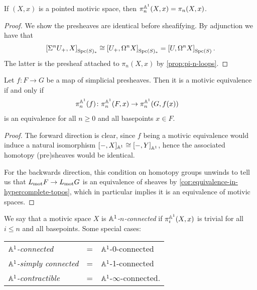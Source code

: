 \documentclass[11pt,openany]{book}
\begin{document}
\begin{proposition} If $(X,x)$ is a pointed motivic space, then $\pi_n^{\mathbb{A}^1}(X,x) = \pi_n(X,x)$.
\end{proposition}
\begin{proof} We show the presheaves are identical before sheafifying. By adjunction we have that
\begin{align*}
    \left[ \Sigma^n U_+, X \right]_{\mathrm{Spc}(S)_\ast} \cong \left[ U_+, \Omega^n X \right]_{\mathrm{Spc}(S)_\ast} = \left[ U, \Omega^n X \right]_{\mathrm{Spc}(S)}.
\end{align*}
The latter is the presheaf attached to $\pi_n(X,x)$ by \autoref{prop:pi-n-loops}.
\end{proof}

\begin{proposition} Let $f\colon F\to G$ be a map of simplicial presheaves. Then it is a motivic equivalence if and only if
\begin{align*}
    \pi_n^{\mathbb{A}^1}(f) \colon \pi_n^{\mathbb{A}^1}(F,x) &\to \pi_n^{\mathbb{A}^1}(G,f(x))
\end{align*}
is an equivalence for all $n\ge0$ and all basepoints $x\in F$.
\end{proposition}
\begin{proof} The forward direction is clear, since $f$ being a motivic equivalence would induce a natural isomorphism $[-,X]_{\mathbb{A}^1} \cong \left[ -,Y \right]_{\mathbb{A}^1}$, hence the associated homotopy (pre)sheaves would be identical.

For the backwards direction, this condition on homotopy groups unwinds to tell us that $L_{\mathrm{mot}} F \to L_{\mathrm{mot}} G$ is an equivalence of sheaves by \autoref{cor:equivalence-in-hypercomplete-topos}, which in particular implies it is an equivalence of motivic spaces.
\end{proof}

\begin{terminology} We say that a motivic space $X$ is $\mathbb{A}^1$\textit{-$n$-connected} if $\pi_i^{\mathbb{A}^1}(X,x)$ is trivial for all $i\le n$ and all basepoints. Some special cases:
\begin{center}
    \begin{tabular}{l l l}
    $\mathbb{A}^1$\textit{-connected} &= & $\mathbb{A}^1$-0-connected \\
    $\mathbb{A}^1$\textit{-simply connected} &= & $\mathbb{A}^1$-1-connected \\
    $\mathbb{A}^1$\textit{-contractible} &= & $\mathbb{A}^1$-$\infty$-connected.
    \end{tabular}
\end{center}
\end{terminology}
\end{document}
